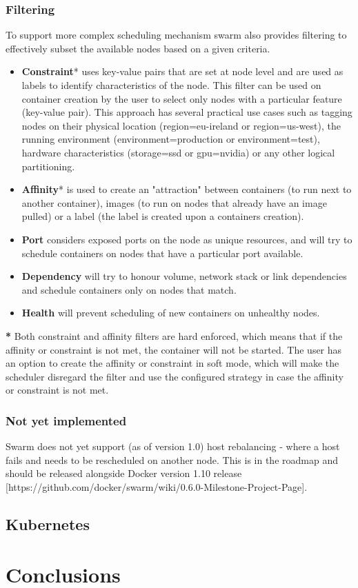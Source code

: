 \documentclass{article}
\begin{document}
\subsubsection{Filtering}
To support more complex scheduling mechanism swarm also provides filtering to effectively subset the available nodes based on a given criteria.
\begin{itemize}
\item \textbf{Constraint}* uses key-value pairs that are set at node level and are used as labels to identify characteristics of the node. This filter can be used on container creation by the user to select only nodes with a particular feature (key-value pair). This approach has several practical use cases such as tagging nodes on their physical location (region=eu-ireland or region=us-west), the running environment (environment=production or environment=test), hardware characteristics (storage=ssd or gpu=nvidia) or any other logical partitioning.
\item \textbf{Affinity}* is used to create an "attraction" between containers (to run next to another container), images (to run on nodes that already have an image pulled) or a label (the label is created upon a containers creation).
\item \textbf{Port} considers exposed ports on the node as unique resources, and will try to schedule containers on nodes that have a particular port available.
\item \textbf{Dependency} will try to honour volume, network stack or link dependencies and schedule containers only on nodes that match.
\item \textbf{Health} will prevent scheduling of new containers on unhealthy nodes.
\end{itemize}
\textbf{*} Both constraint and affinity filters are hard enforced, which means that if the affinity or constraint is not met, the container will not be started. The user has an option to create the affinity or constraint in soft mode, which will make the scheduler disregard the filter and use the configured strategy in case the affinity or constraint is not met.
\subsubsection{Not yet implemented}
Swarm does not yet support (as of version 1.0) host rebalancing - where a host fails and needs to be rescheduled on another node. This is in the roadmap and should be released alongside Docker version 1.10 release [https://github.com/docker/swarm/wiki/0.6.0-Milestone-Project-Page].

\subsection{Kubernetes}
\lipsum[1]

\section{Conclusions}
\lipsum[1]


\vspace{-7.5mm}
\renewcommand{\refname}{\section{References}}

\end{document}
